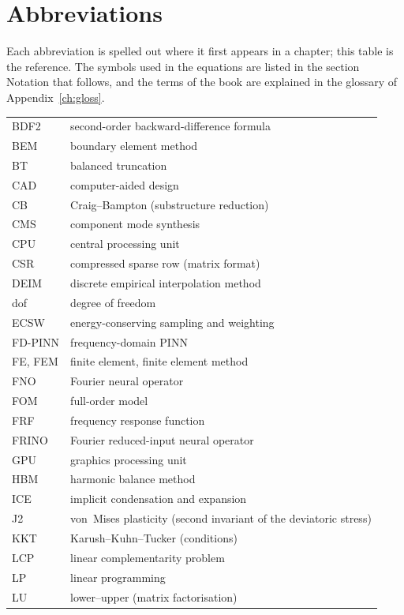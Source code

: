 \chapter*{Abbreviations}
Each abbreviation is spelled out where it first appears in a chapter; this table is the reference. The symbols used in the equations are listed in the section Notation that follows, and the terms of the book are explained in the glossary of Appendix~\ref{ch:gloss}.
\begingroup\small\renewcommand{\arraystretch}{1.12}
\noindent\begin{longtable}{@{}p{}p{}@{}}
\toprule
BDF2 & second-order backward-difference formula\\
BEM & boundary element method\\
BT & balanced truncation\\
CAD & computer-aided design\\
CB & Craig--Bampton (substructure reduction)\\
CMS & component mode synthesis\\
CPU & central processing unit\\
CSR & compressed sparse row (matrix format)\\
DEIM & discrete empirical interpolation method\\
dof & degree of freedom\\
ECSW & energy-conserving sampling and weighting\\
FD-PINN & frequency-domain PINN\\
FE, FEM & finite element, finite element method\\
FNO & Fourier neural operator\\
FOM & full-order model\\
FRF & frequency response function\\
FRINO & Fourier reduced-input neural operator\\
GPU & graphics processing unit\\
HBM & harmonic balance method\\
ICE & implicit condensation and expansion\\
J2 & von~Mises plasticity (second invariant of the deviatoric stress)\\
KKT & Karush--Kuhn--Tucker (conditions)\\
LCP & linear complementarity problem\\
LP & linear programming\\
LU & lower--upper (matrix factorisation)\\

\end{longtable}
